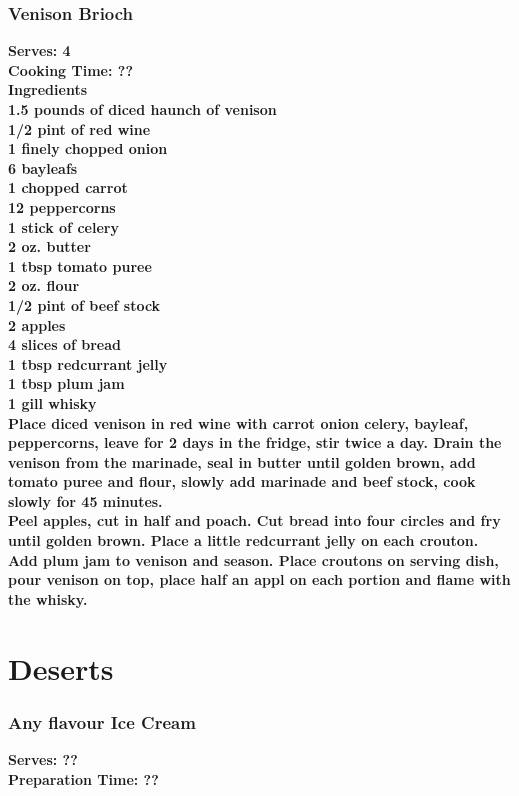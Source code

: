 \documentclass[18pt, oneside]{book}
\begin{document}
\section{Venison Brioch}
\bf{Serves: 4} \\
\bf{Cooking Time: ??} \\

\bf{Ingredients} \normalfont \\
1.5 pounds of diced haunch of venison \\
1/2 pint of red wine \\
1 finely chopped onion \\
6 bayleafs \\
1 chopped carrot \\
12 peppercorns \\
1 stick of celery \\
2 oz. butter \\
1 tbsp tomato puree \\
2 oz. flour \\
1/2 pint of beef stock \\
2 apples \\
4 slices of bread \\
1 tbsp redcurrant jelly \\
1 tbsp plum jam \\
1 gill whisky \\

Place diced venison in red wine with carrot onion celery, bayleaf, peppercorns, leave for 2 days in the fridge, stir twice a day. Drain the venison from the marinade, seal in butter until golden brown, add tomato puree and flour, slowly add marinade and beef stock, cook slowly for 45 minutes. \\

Peel apples, cut in half and poach. Cut bread into four circles and fry until golden brown. Place a little redcurrant jelly on each crouton. Add plum jam to venison and season. Place croutons on serving dish, pour venison on top, place half an appl on each portion and flame with the whisky. 

\part{Deserts}

\section{Any flavour Ice Cream}
\bf{Serves: ??} \\
\bf{Preparation Time: ??} \\ 
\end{document}
